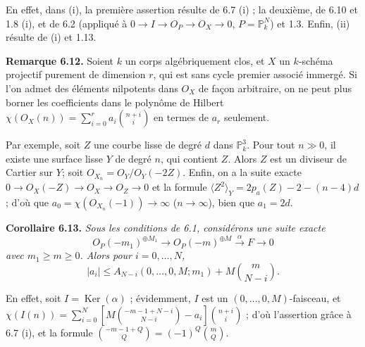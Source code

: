 
En effet, dans (i), la premi\`ere assertion r\'esulte de 6.7 (i) ; la deuxi\`eme, de 6.10 et 1.8 (i), et de 6.2 (appliqu\'e \`a $0\to I\to{O}_P\to{O}_X\to0$, $P=\mathbb P^N_k$) et 1.3. Enfin, (ii) r\'esulte de (i) et 1.13.

\textbf{Remarque 6.12.} Soient $k$ un corps alg\'ebriquement clos, et $X$ un $k$-sch\'ema projectif purement de dimension $r$, qui est sans cycle premier associ\'e immerg\'e. Si l'on admet des \'el\'ements nilpotents dans ${O}_X$ de fa\c{c}on arbitraire, on ne peut plus borner les coefficients dans le polyn\^ome de Hilbert $\chi({O}_X(n))=\sum_{i=0}^{r}a_i\binom{n+i}{i}$ en termes de $a_r$ seulement.

Par exemple, soit $Z$ une courbe lisse de degr\'e $d$ dans $\mathbb P^3_k$. Pour tout $n\gg0$, il existe une surface lisse $Y$ de degr\'e $n$, qui contient $Z$. Alors $Z$ est un diviseur de Cartier sur $Y$; soit ${O}_{X_n}={O}_Y/{O}_Y(-2Z)$. Enfin, on a la suite exacte $0\to{O}_X(-Z)\to{O}_X\to{O}_Z\to0$ et la formule $\langle Z^2\rangle_Y=2p_a(Z)-2-(n-4)d$ ; d'o\`u que $a_0=\chi({O}_{X_n}(-1))\to\infty$ ($n\to\infty$), bien que $a_1=2d$.

\textbf{Corollaire 6.13.} \emph{Sous les conditions de 6.1, consid\'erons une suite exacte}
\[
   {O}_P(-m_1)^{\oplus M_1}\longrightarrow
   {O}_P(-m)^{\oplus M}\xrightarrow{\alpha}F\longrightarrow0
\]
\emph{avec $m_1\ge m\ge0$. Alors pour $i=0,\ldots,N$,}
\[
   |a_i|\le A_{N-i}(0,\ldots,0,M;m_1)+M\binom{m}{N-i}.
\]

En effet, soit $I=\operatorname{Ker}(\alpha)$ ; \'evidemment, $I$ est un $(0,\ldots,0,M)$-faisceau, et $\chi(I(n))=\sum_{i=0}^{N}\left[M\binom{-m-1+N-i}{N-i}-a_i\right]\binom{n+i}{i}$ ; d'o\`u l'assertion gr\^ace \`a 6.7 (i), et la formule $\binom{-m-1+Q}{Q}=(-1)^Q\binom{m}{Q}$.

